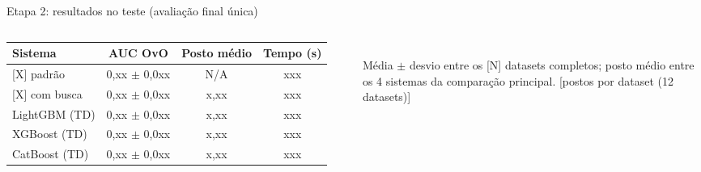 \documentclass[aspectratio=169,11pt]{beamer}
\begin{document}
\begin{frame}{Etapa 2: resultados no teste (avaliação final única)}
    \begin{columns}[T,onlytextwidth]
        \footnotesize
        \setlength{\tabcolsep}{3pt}
        \begin{tabular}{l c c c}
            \toprule
            \textbf{Sistema} & \textbf{AUC OvO} & \textbf{Posto médio} & \textbf{Tempo (s)} \\
            \midrule
            {}[X] padrão    & 0,xx $\pm$ 0,0xx & N/A  & xxx \\
            {}[X] com busca & 0,xx $\pm$ 0,0xx & x,xx & xxx \\
            LightGBM (TD)   & 0,xx $\pm$ 0,0xx & x,xx & xxx \\
            XGBoost (TD)    & 0,xx $\pm$ 0,0xx & x,xx & xxx \\
            CatBoost (TD)   & 0,xx $\pm$ 0,0xx & x,xx & xxx \\
            \bottomrule
        \end{tabular}
        \\[0.3em]
        Média $\pm$ desvio entre os [N] datasets completos; posto médio entre os 4 sistemas da comparação principal.
        \centering
        [postos por dataset (12 datasets)]
    \end{columns}
\end{frame}
\end{document}
